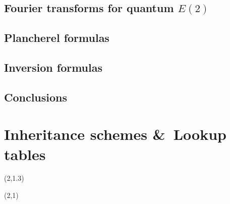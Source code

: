 \documentclass{book}
\begin{document}
\section{Fourier transforms for quantum $E(2)$}

\section{Plancherel formulas}
\label{sect:plancherel}

\section{Inversion formulas}
\label{sect:inversion}

\section{Conclusions}



\appendix



\chapter{Inheritance schemes \&\ Lookup tables}
\label{app:inheritance}


\newpage
\thispagestyle{empty}
(2,1.3){\scalebox{0.82}{}}

\newpage
\newpage

\thispagestyle{empty}
(2,1){\scalebox{0.85}{}}


\end{document}
